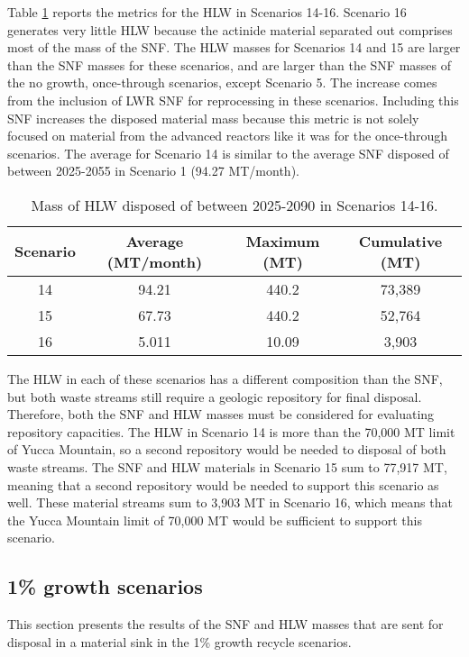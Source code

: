 Table \ref{tab:s14-16_hlw} reports the metrics for the \gls{HLW} 
in Scenarios 14-16. Scenario 16 generates very little 
\gls{HLW} because the actinide material separated out 
comprises most of the mass of the \gls{SNF}. The \gls{HLW} 
masses for Scenarios 14 and 15 are larger than the \gls{SNF} 
masses for these scenarios, and are larger than the \gls{SNF} 
masses of the no growth, once-through scenarios, except 
Scenario 5. The increase 
comes from the inclusion of \gls{LWR} \gls{SNF} for reprocessing 
in these scenarios. Including this \gls{SNF} increases the 
disposed material mass because this metric is not solely focused 
on material from the advanced reactors like it was for 
the once-through scenarios. The average for 
Scenario 14 is similar to the average \gls{SNF} disposed of 
between 2025-2055 in Scenario 1 (94.27 MT/month). 

\begin{table}[h!]
    \centering 
    \caption{Mass of HLW disposed of between 2025-2090 in 
    Scenarios 14-16.}
    \label{tab:s14-16_hlw}
    \begin{tabular}{c c c c}
        \hline 
        Scenario & Average (MT/month) & Maximum (MT) & Cumulative (MT) \\
        \hline
        14 & 94.21 & 440.2 & 73,389\\
        15 & 67.73 & 440.2 & 52,764\\
        16 & 5.011 & 10.09 & 3,903\\
        \hline
    \end{tabular}
\end{table}

The \gls{HLW} in each of these scenarios has a different 
composition than the \gls{SNF}, but both waste streams 
still require a geologic repository for final 
disposal. Therefore, both the \gls{SNF} and \gls{HLW} 
masses must be considered for evaluating repository 
capacities. The \gls{HLW} in Scenario 14 is more than 
the 70,000 MT limit of Yucca Mountain, so a second 
repository would be needed to disposal of both waste 
streams. The \gls{SNF} and \gls{HLW} materials in 
Scenario 15 sum to 77,917 MT, meaning that a second 
repository would be needed to support this scenario 
as well. These material streams sum to 3,903 MT in 
Scenario 16, which means that the Yucca Mountain 
limit of 70,000 MT would be sufficient to support this 
scenario. 


\subsection{1\% growth scenarios}
This section presents the results of the \gls{SNF} and 
\gls{HLW} masses that are sent for disposal in a 
material sink in the 1\% growth recycle scenarios. 

